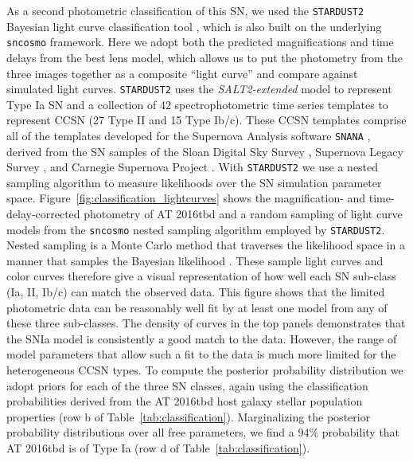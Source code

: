 \documentclass[12pt]{article}
\def\SNABC{AT 2016tbd\xspace}
\begin{document}
As a second photometric classification of this SN, we used the {\tt STARDUST2} Bayesian light curve classification tool \cite{rodney_type_2014}, which is also built on the underlying {\tt sncosmo} framework. Here we adopt both the predicted magnifications and time delays from the best lens model, which allows us to put the photometry from the three images together as a composite ``light curve'' and compare against simulated light curves.  {\tt STARDUST2} uses the {\it SALT2-extended} model to represent Type Ia SN \cite{guy_salt2:_2007, pierel_extending_2018} and a collection of 42  spectrophotometric time series templates to represent CCSN (27 Type II and 15 Type Ib/c).  These CCSN templates comprise all of the templates developed for the Supernova Analysis software {\tt SNANA} \cite{kessler_snana:_2009}, derived from the SN samples of the Sloan Digital Sky Survey \cite{frieman_sloan_2008,sako_sloan_2008, dandrea_type_2010}, Supernova Legacy Survey \cite{astier_supernova_2006}, and Carnegie Supernova Project \cite{hamuy_carnegie_2006, stritzinger_he-rich_2009, morrell_carnegie_2012}.  With {\tt STARDUST2} we use a nested sampling algorithm to measure likelihoods over the SN simulation parameter space.  
Figure~\ref{fig:classification_lightcurves} shows the magnification- and time-delay-corrected photometry of \SNABC and a random sampling of light curve models from the {\tt sncosmo} nested sampling algorithm employed by {\tt STARDUST2}.
Nested sampling is a Monte Carlo method that traverses the likelihood space in a manner that samples the Bayesian likelihood \cite{skilling_nested_2004}.  These sample light curves and color curves therefore give a visual representation of how well each SN sub-class (Ia, II, Ib/c) can match the observed data.
This figure shows that the limited photometric data can be reasonably well fit by at least one model from any of these three sub-classes. 
The density of curves in the top panels demonstrates that the SNIa model is consistently a good match to the data. However, the range of model parameters that allow such a fit to the data is much more limited for the heterogeneous CCSN types. 
To compute the posterior probability distribution we adopt priors for each of the three SN classes, again using the classification probabilities derived from the \SNABC host galaxy stellar population properties (row b of Table~\ref{tab:classification}). 
Marginalizing the posterior  probability distributions over all free parameters, we find a 94\% probability that \SNABC is of Type Ia (row d of Table~\ref{tab:classification}).  
\end{document}
